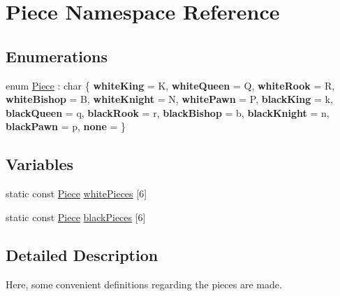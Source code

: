 \hypertarget{namespacePiece}{}\section{Piece Namespace Reference}
\label{namespacePiece}
\subsection*{Enumerations}
\begin{DoxyCompactItemize}
\item 
enum \hyperlink{namespacePiece_a588233307aa6bdb32c1d62c9f20895cc}{Piece} \+: char \{ \newline
{\bfseries white\+King} = \textquotesingle{}K\textquotesingle{}, 
{\bfseries white\+Queen} = \textquotesingle{}Q\textquotesingle{}, 
{\bfseries white\+Rook} = \textquotesingle{}R\textquotesingle{}, 
{\bfseries white\+Bishop} = \textquotesingle{}B\textquotesingle{}, 
\newline
{\bfseries white\+Knight} = \textquotesingle{}N\textquotesingle{}, 
{\bfseries white\+Pawn} = \textquotesingle{}P\textquotesingle{}, 
{\bfseries black\+King} = \textquotesingle{}k\textquotesingle{}, 
{\bfseries black\+Queen} = \textquotesingle{}q\textquotesingle{}, 
\newline
{\bfseries black\+Rook} = \textquotesingle{}r\textquotesingle{}, 
{\bfseries black\+Bishop} = \textquotesingle{}b\textquotesingle{}, 
{\bfseries black\+Knight} = \textquotesingle{}n\textquotesingle{}, 
{\bfseries black\+Pawn} = \textquotesingle{}p\textquotesingle{}, 
\newline
{\bfseries none} = \textquotesingle{} \textquotesingle{}
 \}
\end{DoxyCompactItemize}
\subsection*{Variables}
\begin{DoxyCompactItemize}
\item 
static const \hyperlink{namespacePiece_a588233307aa6bdb32c1d62c9f20895cc}{Piece} \hyperlink{namespacePiece_a8c9ba77d6f9a9bb67a5a5d8e95a9f945}{white\+Pieces} \mbox{[}6\mbox{]}
\item 
static const \hyperlink{namespacePiece_a588233307aa6bdb32c1d62c9f20895cc}{Piece} \hyperlink{namespacePiece_a531c90c92acec2708048ce3b9caddf2a}{black\+Pieces} \mbox{[}6\mbox{]}
\end{DoxyCompactItemize}


\subsection{Detailed Description}
Here, some convenient definitions regarding the pieces are made. 

